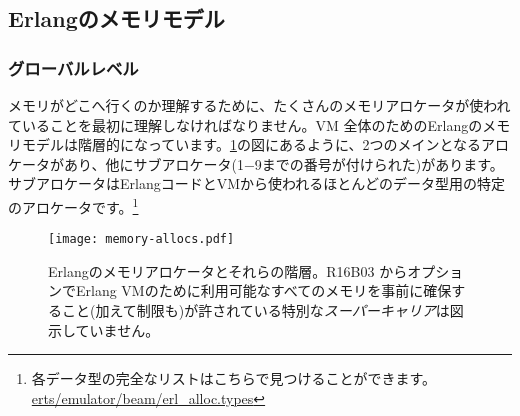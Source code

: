 \subsection{Erlangのメモリモデル}
\label{subsec:erlang-memory-model}

\subsubsection{グローバルレベル}

メモリがどこへ行くのか理解するために、たくさんのメモリアロケータが使われていることを最初に理解しなければなりません。VM 全体のためのErlangのメモリモデルは階層的になっています。\ref{fig:allocators}の図にあるように、2つのメインとなるアロケータがあり、他にサブアロケータ(1−9までの番号が付けられた)があります。サブアロケータはErlangコードとVMから使われるほとんどのデータ型用の特定のアロケータです。\footnote{各データ型の完全なリストはこちらで見つけることができます。\href{https://github.com/erlang/otp/blob/maint/erts/emulator/beam/erl\_alloc.types}{erts/emulator/beam/erl\_alloc.types}}


\begin{figure}
  \texttt{[image: memory-allocs.pdf]}%
  \caption{Erlangのメモリアロケータとそれらの階層。R16B03 からオプションでErlang VMのために利用可能なすべてのメモリを事前に確保すること(加えて制限も)が許されている特別な\emph{スーパーキャリア}は図示していません。}%
   \label{fig:allocators}
\end{figure}

